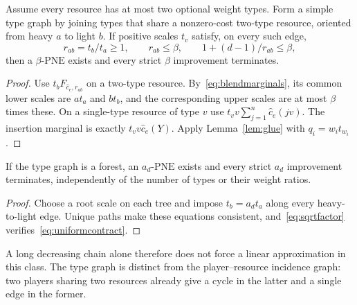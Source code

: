 \documentclass[manuscript,review,anonymous]{acmart}
\newcommand{\PNE}{\mathrm{PNE}}
\begin{document}
\begin{theorem}\label{thm:typescales}
Assume every resource has at most two optional weight types. Form a simple type graph by joining types that share a nonzero-cost two-type resource, oriented from heavy $a$ to light $b$. If positive scales $t_v$ satisfy, on every such edge,
\begin{equation}\label{eq:uniformcontract}
 r_{ab}=t_b/t_a\ge1,\qquad
 r_{ab}\le\beta,\qquad 1+(d-1)/r_{ab}\le\beta,
\end{equation}
then a $\beta$-$\PNE$ exists and every strict $\beta$ improvement terminates.
\end{theorem}
\begin{proof}
Use $t_bF_{\widehat c_e,r_{ab}}$ on a two-type resource. By~\eqref{eq:blendmarginals}, its common lower scales are $at_a$ and $bt_b$, and the corresponding upper scales are at most $\beta$ times these. On a single-type resource of type $v$ use $t_vv\sum_{j=1}^n\widehat c_e(jv)$. The insertion marginal is exactly $t_vv\widehat c_e(Y)$. Apply Lemma~\ref{lem:glue} with $q_i=w_it_{w_i}$.
\end{proof}
\begin{corollary}\label{cor:forest}
If the type graph is a forest, an $a_d$-$\PNE$ exists and every strict $a_d$ improvement terminates, independently of the number of types or their weight ratios.
\end{corollary}
\begin{proof}
Choose a root scale on each tree and impose $t_b=a_dt_a$ along every heavy-to-light edge. Unique paths make these equations consistent, and~\eqref{eq:sqrtfactor} verifies~\eqref{eq:uniformcontract}.
\end{proof}
A long decreasing chain alone therefore does not force a linear approximation in this class. The type graph is distinct from the player--resource incidence graph: two players sharing two resources already give a cycle in the latter and a single edge in the former.
\end{document}
